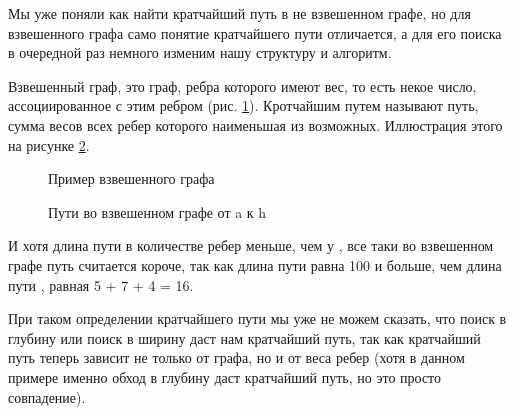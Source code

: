 \documentclass[../article.tex]{subfiles}
\begin{document}
{Мы уже поняли как найти кратчайший путь в не взвешенном графе, но для взвешенного графа само понятие кратчайшего пути отличается, а для его поиска в очередной раз немного изменим нашу структуру и алгоритм.}

Взвешенный граф, это граф, ребра которого имеют вес, то есть некое число, ассоциированное с этим ребром (рис. \ref{fig:weightedGraphExample}). Кротчайшим путем называют путь, сумма весов всех ребер которого наименьшая из возможных. Иллюстрация этого на рисунке \ref{fig:compareWeightedPaths}.

\begin{figure}
    \caption{Пример взвешенного графа}
    \label{fig:weightedGraphExample}
\end{figure}

\begin{figure}
    \caption{Пути во взвешенном графе от {\firacodebold a} к {\firacodebold h}}
    \label{fig:compareWeightedPaths}
\end{figure}

И хотя длина пути {\firacodebold [a, h]} в количестве ребер меньше, чем у {\firacodebold [a, f, g, h]}, все таки во взвешенном графе путь {\firacodebold [a, f, g, h]} считается короче, так как длина пути {\firacodebold [a, h]} равна 100 и больше, чем длина пути {\firacodebold [a, f, g, h]}, равная 5 + 7 + 4 = 16.

При таком определении кратчайшего пути мы уже не можем сказать, что поиск в глубину или поиск в ширину даст нам кратчайший путь, так как кратчайший путь теперь зависит не только от графа, но и от веса ребер (хотя в данном примере именно обход в глубину даст кратчайший путь, но это просто совпадение).
\end{document}
